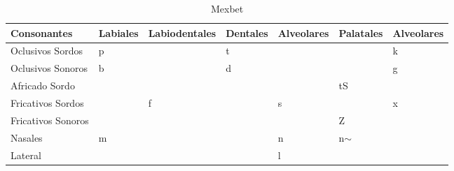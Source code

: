 \begin{table}[H]
\centering
\caption{Mexbet}
\label{tab:mexbet}
\begin{tabular}{|l|l|l|l|l|l|l|}
\textbf{Consonantes}         & \textbf{Labiales}     & \textbf{Labiodentales} & \textbf{Dentales}     & \textbf{Alveolares}    & \textbf{Palatales}    & \textbf{Alveolares}  \\ \hline
Oclusivos Sordos             & p    &       & t    &       &      & k   \\ \hline
Oclusivos Sonoros            & b    &       & d    &       &      & g   \\ \hline
Africado Sordo               &      &       &      &       & tS   &     \\ \hline
Fricativos Sordos            &      & f     &      & s     &      & x   \\ \hline
Fricativos Sonoros           &      &       &      &       & Z    &     \\ \hline
Nasales     & m    &       &      & n     & n$\sim$               &     \\ \hline
Lateral &  &  &  & l & & \\ \hline
\end{tabular}
\end{table}